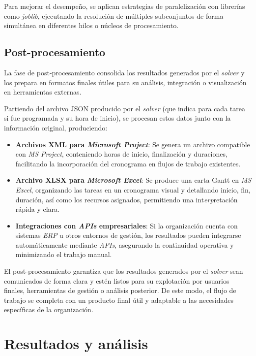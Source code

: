 \documentclass{article}
\begin{document}
Para mejorar el desempeño, se aplican estrategias de paralelización con librerías como \textit{joblib}, ejecutando la resolución de múltiples subconjuntos de forma simultánea en diferentes hilos o núcleos de procesamiento.


\subsection{Post-procesamiento}

La fase de post-procesamiento consolida los resultados generados por el \textit{solver} y los prepara en formatos finales útiles para su análisis, integración o visualización en herramientas externas.

Partiendo del archivo JSON producido por el \textit{solver} (que indica para cada tarea si fue programada y su hora de inicio), se procesan estos datos junto con la información original, produciendo:

\begin{itemize}
    \item \textbf{Archivos XML para \textit{Microsoft Project}}: Se genera un archivo compatible con \textit{MS Project}, conteniendo horas de inicio, finalización y duraciones, facilitando la incorporación del cronograma en flujos de trabajo existentes.

    \item \textbf{Archivo XLSX para \textit{Microsoft Excel}}: Se produce una carta Gantt en \textit{MS Excel}, organizando las tareas en un cronograma visual y detallando inicio, fin, duración, así como los recursos asignados, permitiendo una int\textit{erp}retación rápida y clara.

    \item \textbf{Integraciones con \textit{APIs} empresariales}: Si la organización cuenta con sistemas \textit{ERP} u otros entornos de gestión, los resultados pueden integrarse automáticamente mediante \textit{APIs}, asegurando la continuidad operativa y minimizando el trabajo manual.
\end{itemize}

El post-procesamiento garantiza que los resultados generados por el \textit{solver} sean comunicados de forma clara y estén listos para su explotación por usuarios finales, herramientas de gestión o análisis posterior. De este modo, el flujo de trabajo se completa con un producto final útil y adaptable a las necesidades específicas de la organización.

\section{Resultados y análisis}
\end{document}
